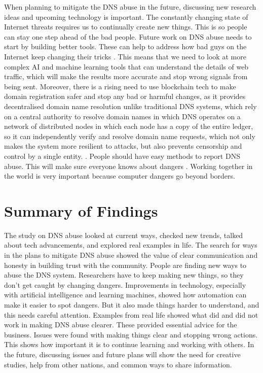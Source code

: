 When planning to mitigate the DNS abuse in the future, discussing new research ideas and upcoming technology is important. The constantly changing state of Internet threats requires us to continually create new things. This is so people can stay one step ahead of the bad people. Future work on DNS abuse needs to start by building better tools. These can help to address how bad guys on the Internet keep changing their tricks \cite{bovenzi2023blockchain}. This means that we need to look at more complex AI and machine learning tools that can understand the details of web traffic, which will make the results more accurate and stop wrong signals from being sent. Moreover, there is a rising need to use blockchain tech to make domain registration safer and stop any bad or harmful changes, as it provides decentralised domain name resolution unlike traditional DNS systems, which rely on a central authority to resolve domain names in which DNS operates on a network of distributed nodes in which each node has a copy of the entire ledger, so it can independently verify and resolve domain name requests, which not only makes the system more resilient to attacks, but also prevents censorship and control by a single entity. \cite{FinanceStrategists2023BlockchainDNS}.  People should have easy methods to report DNS abuse. This will make sure everyone knows about dangers \cite{gu2021iot}. Working together in the world is very important because computer dangers go beyond borders. 


\section{Summary of Findings}

The study on DNS abuse looked at current ways, checked new trends, talked about tech advancements, and explored real examples in life. The search for ways in the plans to mitigate DNS abuse showed the value of clear communication and honesty in building trust with the community. People are finding new ways to abuse the DNS system. Researchers have to keep making new things, so they don't get caught by changing dangers. Improvements in technology, especially with artificial intelligence and learning machines, showed how automation can make it easier to spot dangers. But it also made things harder to understand, and this needs careful attention. Examples from real life showed what did and did not work in making DNS abuse clearer. These provided essential advice for the business. Issues were found with making things clear and stopping wrong actions. This shows how important it is to continue learning and working with others. In the future, discussing issues and future plans will show the need for creative studies, help from other nations, and common ways to share information. 

